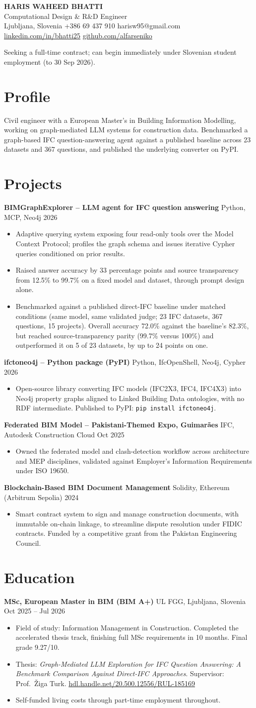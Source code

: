 \documentclass[a4paper,10.5pt]{article}
\newcommand{\datefill}{\dotfill}
\newcommand{\entry}[3]{\vspace{2.5pt}\noindent\textbf{#1} \textbar{} #2 \datefill{} #3\par\vspace{0.5pt}}
\newcommand{\ROLELINE}{Computational Design \& R\&D Engineer}
\newcommand{\projIfcToNeo}{%
\entry{ifctoneo4j -- Python package (PyPI)}{Python, IfcOpenShell, Neo4j, Cypher}{2026}
\begin{itemize}
  \item Open-source library converting IFC models (IFC2X3, IFC4, IFC4X3) into Neo4j
        property graphs aligned to Linked Building Data ontologies, with no RDF
        intermediate. Published to PyPI: \texttt{pip install ifctoneo4j}.
\end{itemize}}
\newcommand{\projBIMGraph}{%
\entry{BIMGraphExplorer -- LLM agent for IFC question answering}{Python, MCP, Neo4j}{2026}
\begin{itemize}
  \item Adaptive querying system exposing four read-only tools over the Model
        Context Protocol; profiles the graph schema and issues iterative Cypher
        queries conditioned on prior results.
  \item Raised answer accuracy by 33 percentage points and source transparency from
        12.5\% to 99.7\% on a fixed model and dataset, through prompt design alone.
  \item Benchmarked against a published direct-IFC baseline under matched
        conditions (same model, same validated judge; 23 IFC datasets, 367
        questions, 15 projects). Overall accuracy 72.0\% against the baseline's
        82.3\%, but reached source-transparency parity (99.7\% versus 100\%) and
        outperformed it on 5 of 23 datasets, by up to 24 points on one.
\end{itemize}}
\newcommand{\projGuimaraes}{%
\entry{Federated BIM Model -- Pakistani-Themed Expo, Guimar\~aes}{IFC, Autodesk Construction Cloud}{Oct 2025}
\begin{itemize}
  \item Owned the federated model and clash-detection workflow across architecture
        and MEP disciplines, validated against Employer's Information Requirements
        under ISO 19650.
\end{itemize}}
\newcommand{\projBlockchain}{%
\entry{Blockchain-Based BIM Document Management}{Solidity, Ethereum (Arbitrum Sepolia)}{2024}
\begin{itemize}
  \item Smart contract system to sign and manage construction documents, with
        immutable on-chain linkage, to streamline dispute resolution under FIDIC
        contracts. Funded by a competitive grant from the
        Pakistan Engineering Council.
\end{itemize}}
\begin{document}
\begin{center}
  {\LARGE\bfseries HARIS WAHEED BHATTI}\\[2pt]
  {\large \ROLELINE}\\[3pt]
  Ljubljana, Slovenia \textbar{} +386 69 437 910 \textbar{} harisw95@gmail.com\\
  \href{https://linkedin.com/in/bhatti25}{linkedin.com/in/bhatti25} \textbar{}
  \href{https://github.com/alfarseniko}{github.com/alfarseniko}
\end{center}
\vspace{-4pt}
\noindent\small Seeking a full-time contract; can begin immediately under Slovenian student employment (to 30 Sep 2026).\normalsize

\section{Profile}

\noindent Civil engineer with a European Master's in Building Information Modelling,
working on graph-mediated LLM systems for construction data. Benchmarked a
graph-based IFC question-answering agent against a published baseline across 23
datasets and 367 questions, and published the underlying converter on PyPI.

\section{Projects}

   \projBIMGraph \projIfcToNeo \projGuimaraes \projBlockchain 

\section{Education}
\entry{MSc, European Master in BIM (BIM A+)}{UL FGG, Ljubljana, Slovenia}{Oct 2025 -- Jul 2026}
\begin{itemize}
  \item Field of study: Information Management in Construction. Completed the
        accelerated thesis track, finishing full MSc requirements in 10 months.
        Final grade 9.27/10.
  \item Thesis: \textit{Graph-Mediated LLM Exploration for IFC Question Answering:
        A Benchmark Comparison Against Direct-IFC Approaches}. Supervisor:
        Prof.~\v{Z}iga Turk. \href{http://hdl.handle.net/20.500.12556/RUL-185169}{hdl.handle.net/20.500.12556/RUL-185169}
  \item Self-funded living costs through part-time employment throughout.
\end{itemize}
\end{document}
